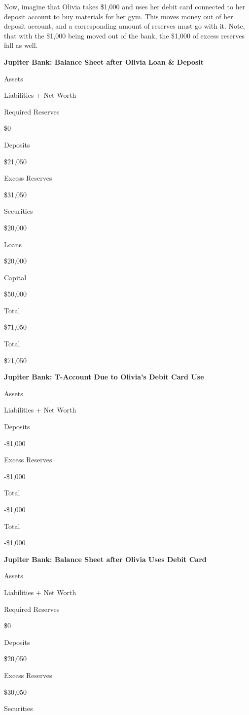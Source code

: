 \documentclass[
]{book}
\begin{document}
Now, imagine that Olivia takes \$1,000 and uses her debit card connected to her deposit account to buy materials for her gym. This moves money out of her deposit account, and a corresponding amount of reserves must go with it. Note, that with the \$1,000 being moved out of the bank, the \$1,000 of excess reserves fall as well.

\label{tab:t11}\textbf{Jupiter Bank: Balance Sheet after Olivia Loan \& Deposit}

Assets

Liabilities + Net Worth

Required Reserves

\$0

Deposits

\$21,050

Excess Reserves

\$31,050

Securities

\$20,000

Loans

\$20,000

Capital

\$50,000

Total

\$71,050

Total

\$71,050

\label{tab:t12}\textbf{Jupiter Bank: T-Account Due to Olivia's Debit Card Use}

Assets

Liabilities + Net Worth

Deposits

-\$1,000

Excess Reserves

-\$1,000

Total

-\$1,000

Total

-\$1,000

\label{tab:t13}\textbf{Jupiter Bank: Balance Sheet after Olivia Uses Debit Card}

Assets

Liabilities + Net Worth

Required Reserves

\$0

Deposits

\$20,050

Excess Reserves

\$30,050

Securities
\end{document}
